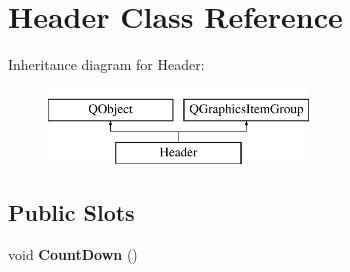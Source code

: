 \hypertarget{classHeader}{\section{Header Class Reference}
\label{classHeader}
}
Inheritance diagram for Header\-:\begin{figure}[H]
\begin{center}
\leavevmode
\includegraphics[height=2.000000cm]{classHeader}
\end{center}
\end{figure}
\subsection*{Public Slots}
\begin{DoxyCompactItemize}
\item 
\hypertarget{classHeader_a427b5d03b37b2f1bca1c5905447f42df}{void {\bfseries Count\-Down} ()}\label{classHeader_a427b5d03b37b2f1bca1c5905447f42df}

\end{DoxyCompactItemize}
